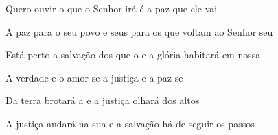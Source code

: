 \begin{multicols}{2}
  \begin{greenumerate}
    \item {}Quero ouvir o que o Senhor irá  é a paz que ele vai 

    \item {}A paz para o seu povo e seus  para os que voltam ao Senhor seu 

    \item {}Está perto a salvação dos que o  e a glória habitará em nossa 

    \item {}A verdade e o amor se  a justiça e a paz se 

    \item {}Da terra brotará a  e a justiça olhará dos altos 

    \item {}A justiça andará na sua  e a salvação há de seguir os passos 
  \end{greenumerate}
\end{multicols}